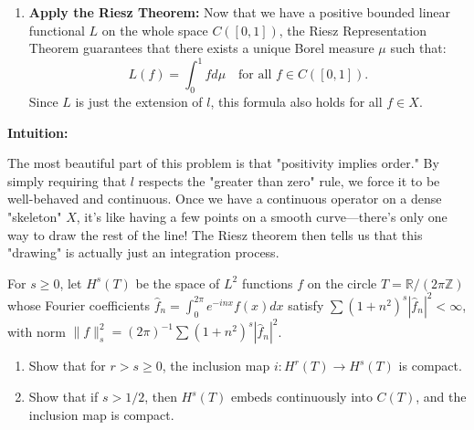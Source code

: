 \begin{solution}
\begin{enumerate}
    \item \textbf{Apply the Riesz Theorem:}
        Now that we have a positive bounded linear functional $L$ on the whole space $C([0, 1])$, the Riesz Representation Theorem guarantees that there exists a unique Borel measure $\mu$ such that:
        \[ L(f) = \int_0^1 f d\mu \quad \text{for all } f \in C([0, 1]). \]
        Since $L$ is just the extension of $l$, this formula also holds for all $f \in X$.
\end{enumerate}


\textbf{Intuition:}

The most beautiful part of this problem is that "positivity implies order." By simply requiring that $l$ respects the "greater than zero" rule, we force it to be well-behaved and continuous. Once we have a continuous operator on a dense "skeleton" $X$, it's like having a few points on a smooth curve—there's only one way to draw the rest of the line! The Riesz theorem then tells us that this "drawing" is actually just an integration process.
\end{solution}

\begin{exercise}
\label{analysis:2011:6}
For $s \geq 0$, let $H^s(T)$ be the space of $L^2$ functions $f$ on the circle $T = \mathbb{R}/(2\pi\mathbb{Z})$ whose Fourier coefficients $\hat{f}_n = \int_0^{2\pi} e^{-inx} f(x) dx$ satisfy $\sum (1+n^2)^s |\hat{f}_n|^2 < \infty$, with norm $\|f\|_s^2 = (2\pi)^{-1} \sum (1+n^2)^s |\hat{f}_n|^2$.
\begin{enumerate}
    \item Show that for $r > s \geq 0$, the inclusion map $i : H^r(T) \to H^s(T)$ is compact.
    \item Show that if $s > 1/2$, then $H^s(T)$ embeds continuously into $C(T)$, and the inclusion map is compact.
\end{enumerate}
\end{exercise}

